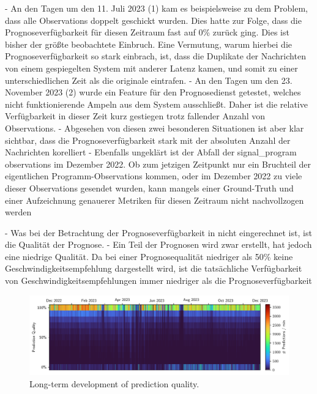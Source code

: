 - An den Tagen um den 11. Juli 2023 (1) kam es beispielsweise zu dem Problem, dass alle Observations doppelt geschickt wurden. Dies hatte zur Folge, dass die Prognoseverfügbarkeit für diesen Zeitraum fast auf 0\% zurück ging. Dies ist bisher der größte beobachtete Einbruch. Eine Vermutung, warum hierbei die Prognoseverfügbarkeit so stark einbrach, ist, dass die Duplikate der Nachrichten von einem gespiegelten System mit anderer Latenz kamen, und somit zu einer unterschiedlichen Zeit als die originale eintrafen.
- An den Tagen um den 23. November 2023 (2) wurde ein Feature für den Prognosedienst getestet, welches nicht funktionierende Ampeln aus dem System ausschließt. Daher ist die relative Verfügbarkeit in dieser Zeit kurz gestiegen trotz fallender Anzahl von Observations. 
- Abgesehen von diesen zwei besonderen Situationen ist aber klar sichtbar, dass die Prognoseverfügbarkeit stark mit der absoluten Anzahl der Nachrichten korelliert
- Ebenfalls ungeklärt ist der Abfall der signal\_program observations im Dezember 2022. Ob zum jetzigen Zeitpunkt nur ein Bruchteil der eigentlichen Programm-Observations kommen, oder im Dezember 2022 zu viele dieser Observations gesendet wurden, kann mangels einer Ground-Truth und einer Aufzeichnung genauerer Metriken für diesen Zeitraum nicht nachvollzogen werden

- Was bei der Betrachtung der Prognoseverfügbarkeit in  nicht eingerechnet ist, ist die Qualität der Prognose. 
- Ein Teil der Prognosen wird zwar erstellt, hat jedoch eine niedrige Qualität. Da bei einer Prognosequalität niedriger als 50\% keine Geschwindigkeitsempfehlung dargestellt wird, ist die tatsächliche Verfügbarkeit von Geschwindigkeitsempfehlungen immer niedriger als die Prognoseverfügbarkeit

\begin{figure}[t]
    \centering
    \includegraphics[width=\linewidth]{images/monitoring-long-term-study.pdf}
    \caption{Long-term development of prediction quality.}\label{fig:monitoring-long-term-study}
\end{figure}

